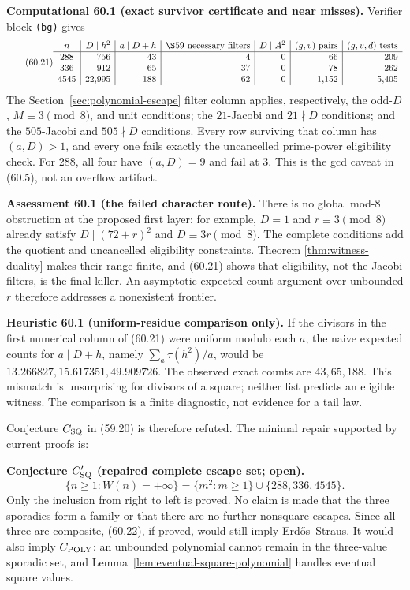 \documentclass[10pt,reqno]{amsart}
\theoremstyle{definition}
\newcommand{\1}{\mathbf 1}
\begin{document}
\medskip\noindent\textbf{Computational 60.1 (exact survivor certificate
and near misses).}
Verifier block \texttt{(bg)} gives
\begin{equation}\tag{60.21}
\begin{array}{c|r|r|r|r|r|r}
 n&D\mid h^2&a\mid D+h&\text{\S59 necessary filters}&D\mid A^2
 &(g,v)\text{ pairs}&(g,v,d)\text{ tests}\\ \hline
288&756&43&4&0&66&209\\
336&912&65&37&0&78&262\\
4545&22{,}995&188&62&0&1{,}152&5{,}405
\end{array}
\end{equation}
The Section~\ref{sec:polynomial-escape} filter column applies, respectively,
the odd-$D$, $M\equiv3\pmod8$, and unit conditions; the $21$-Jacobi and
$21\nmid D$ conditions; and the $505$-Jacobi and $505\nmid D$ conditions.
Every row surviving that column has $(a,D)>1$, and every one fails exactly
the uncancelled prime-power eligibility check.  For $288$, all four have
$(a,D)=9$ and fail at $3$.  This is the gcd caveat in (60.5), not an
overflow artifact.

\medskip\noindent\textbf{Assessment 60.1 (the failed character route).}
There is no global mod-$8$ obstruction at the proposed first layer: for
example, $D=1$ and $r\equiv3\pmod8$ already satisfy
$D\mid(72+r)^2$ and $D\equiv3r\pmod8$.  The complete conditions add the
quotient and uncancelled eligibility constraints.  Theorem
\ref{thm:witness-duality} makes their range finite, and (60.21) shows that
eligibility, not the Jacobi filters, is the final killer.  An asymptotic
expected-count argument over unbounded $r$ therefore addresses a
nonexistent frontier.

\medskip\noindent\textbf{Heuristic 60.1 (uniform-residue comparison only).}
If the divisors in the first numerical column of (60.21) were uniform
modulo each $a$, the naive expected counts for $a\mid D+h$, namely
$\sum_a\tau(h^2)/a$, would be $13.266827,15.617351,49.909726$.  The observed
exact counts are $43,65,188$.  This mismatch is unsurprising for divisors of
a square; neither list predicts an eligible witness.  The comparison is a
finite diagnostic, not evidence for a tail law.

Conjecture $C_{\rm SQ}$ in (59.20) is therefore refuted.  The minimal repair
supported by current proofs is:

\medskip\noindent\textbf{Conjecture $C_{\rm SQ}'$ (repaired complete escape
set; open).}
\begin{equation}\tag{60.22}
 \{n\geq1:W(n)=+\infty\}
 =\{m^2:m\geq1\}\cup\{288,336,4545\}.
\end{equation}
Only the inclusion from right to left is proved.  No claim is made that the
three sporadics form a family or that there are no further nonsquare
escapes.  Since all three are composite, (60.22), if proved, would still
imply Erd\H{o}s--Straus.  It would also imply $C_{\rm POLY}$: an unbounded
polynomial cannot remain in the three-value sporadic set, and
Lemma~\ref{lem:eventual-square-polynomial} handles eventual square values.
\end{document}
